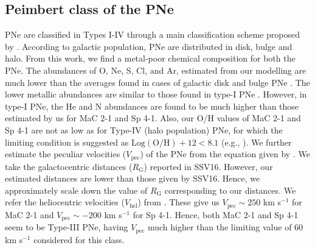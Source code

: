 \documentclass[a4paper,fleqn,usenatbib]{mnras}
\begin{document}
\subsection{Peimbert class of the PNe}
PNe are classified in Types I-IV through a main classification scheme proposed by \citet{1978IAUS...76..215P}. According to galactic population, PNe are distributed in disk, bulge and halo. From this work, we find a metal-poor chemical composition for both the PNe. The abundances of O, Ne, S, Cl, and Ar, estimated from our modelling are much lower than the averages found in cases of galactic disk and bulge PNe \citep{2007MNRAS.381..669W}. The lower metallic abundances are similar to those found in type-I PNe \citep{1987RMxAA..14..540P}. However, in type-I PNe, the He and N abundances are found to be much higher than those estimated by us for MaC 2-1 and Sp 4-1. Also, our O/H values of MaC 2-1 and Sp 4-1 are not as low as for Type-IV (halo population) PNe, for which the limiting condition is suggested as $\mathrm{Log(O/H)}+12<8.1$ (e.g., \citealt{2003PASP..115...67O}). We further estimate the peculiar velocities ($V_\mathrm{pec}$) of the PNe from the equation given by \citet{2013RMxAA..49...87P}. We take the galactocentric distances ($R_\mathrm{G}$) reported in SSV16. However, our estimated distances are lower than those given by SSV16. Hence, we approximately scale down the value of $R_\mathrm{G}$ corresponding to our distances. We refer the heliocentric velocities ($V_\mathrm{hel}$) from \citet{SPMCatalog}. These give us $V_\mathrm{pec}\sim250$ km s$^{-1}$ for MaC 2-1 and $V_\mathrm{pec}\sim-200$ km s$^{-1}$ for Sp 4-1. Hence, both MaC 2-1 and Sp 4-1 seem to be Type-III PNe, having $V_\mathrm{pec}$ much higher than the limiting value of $60$ km s$^{-1}$ considered for this class. 
\end{document}
